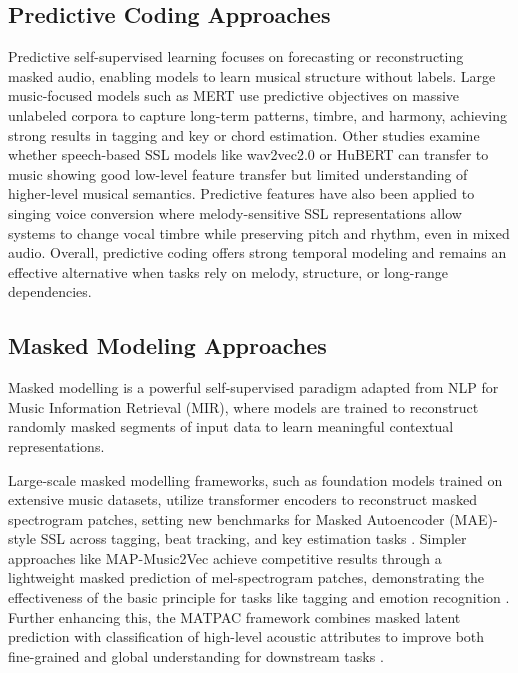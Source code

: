 \documentclass[12pt]{report}
\begin{document}
\subsection{Predictive Coding Approaches}
Predictive self-supervised learning focuses on forecasting or reconstructing masked audio, enabling models to learn musical structure without labels. Large music-focused models such as MERT \cite{li_mert_2024}
use predictive objectives on massive unlabeled corpora to capture long-term patterns, timbre, and harmony, achieving strong results in tagging and key or chord estimation. Other studies examine whether speech-based SSL models like wav2vec2.0 or HuBERT can transfer to music \cite{ma_effectiveness_2023}
showing good low-level feature transfer but limited understanding of higher-level musical semantics. Predictive features have also been applied to singing voice conversion \cite{chen_singing_2025}
where melody-sensitive SSL representations allow systems to change vocal timbre while preserving pitch and rhythm, even in mixed audio. Overall, predictive coding offers strong temporal modeling and remains an effective alternative when tasks rely on melody, structure, or long-range dependencies.

\subsection{Masked Modeling Approaches}

Masked modelling is a powerful self-supervised paradigm adapted from NLP for Music Information Retrieval (MIR), where models are trained to reconstruct randomly masked segments of input data to learn meaningful contextual representations.

Large-scale masked modelling frameworks, such as foundation models trained on extensive music datasets, utilize transformer encoders to reconstruct masked spectrogram patches, setting new benchmarks for Masked Autoencoder (MAE)-style SSL across tagging, beat tracking, and key estimation tasks \cite{won_foundation_2024}. Simpler approaches like MAP-Music2Vec achieve competitive results through a lightweight masked prediction of mel-spectrogram patches, demonstrating the effectiveness of the basic principle for tasks like tagging and emotion recognition \cite{li_map-music2vec_2022}. Further enhancing this, the MATPAC framework combines masked latent prediction with classification of high-level acoustic attributes to improve both fine-grained and global understanding for downstream tasks \cite{quelennec_matpac_2025}.
\end{document}
